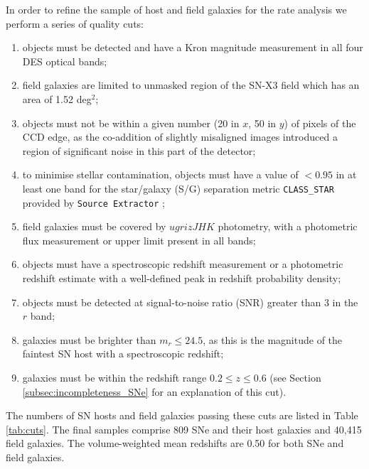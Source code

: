 \documentclass[fleqn,usenatbib]{mnras}
\begin{document}
In order to refine the sample of host and field galaxies for the rate analysis we perform a series of quality cuts:

\begin{enumerate}
    \item objects must be detected and have a Kron magnitude measurement in all four DES optical bands;

    \item field galaxies are limited to unmasked region of the SN-X3 field \citep{Hartley2020} which has an area of 1.52 deg$^2$;

    \item objects must not be within a given number (20 in $x$, 50 in $y$) of pixels of the CCD edge, as the co-addition of slightly misaligned images introduced a region of significant noise in this part of the detector;

    \item to minimise stellar contamination, objects must have a value of $<0.95$ in at least one band for the star/galaxy (S/G) separation metric \texttt{CLASS\_STAR} provided by \texttt{Source Extractor} \citep{Bertin1996};

    \item field galaxies must be covered by $ugrizJHK$ photometry, with a photometric flux measurement or upper limit present in all bands;

    \item objects must have a spectroscopic redshift measurement or a photometric redshift estimate with a well-defined peak in redshift  probability density;

    \item objects must be detected at signal-to-noise ratio (SNR) greater than 3 in the $r$ band;

    \item galaxies must be brighter than $m_r \leq 24.5$, as this is the magnitude of the faintest SN host with a spectroscopic redshift;

    \item galaxies must be within the redshift range $0.2 \leq z \leq 0.6$ (see Section \ref{subsec:incompleteness_SNe} for an explanation of this cut).
\end{enumerate}

The numbers of SN hosts and field galaxies passing these cuts are listed in Table \ref{tab:cuts}. The final samples comprise 809 SNe and their host galaxies and 40,415 field galaxies. The volume-weighted mean redshifts are 0.50 for both SNe and field galaxies.
\end{document}
